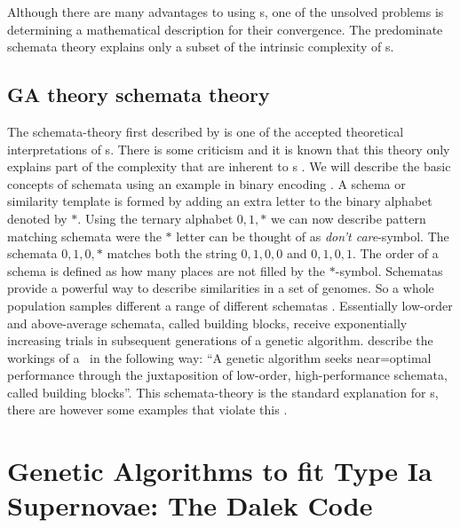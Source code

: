 Although there are many advantages to using \ga s, one of the unsolved problems is determining a mathematical description for their convergence. The predominate schemata theory explains only a subset of the intrinsic complexity of \ga s.

\subsection{GA theory schemata theory}

The schemata-theory first described by \cite{holland1975} is one of the accepted theoretical interpretations of \ga s. There is some criticism and it is known that this theory only explains part of the complexity that are inherent to \ga s \citep[see ][ and references therein]{Whitley94agenetic}. We will describe the basic concepts of schemata using an example in binary encoding \citep[notation adapted from ][]{citeulike:125978}. A schema or similarity template is formed by adding an extra letter to the binary alphabet denoted by $*$. Using the ternary alphabet ${0, 1, *}$ we can now describe pattern matching schemata were the $*$ letter can be thought of as \textit{don't care}-symbol. The schemata ${0, 1, 0, *}$ matches both the string ${0, 1, 0, 0}$ and ${0, 1, 0, 1}$. The order of a schema is defined as how many places are not filled by the $*$-symbol. Schematas provide a powerful way to describe similarities in a set of genomes. 
So a whole population samples different a range of different schematas . Essentially low-order and above-average schemata, called building blocks, receive exponentially increasing trials in subsequent generations of a genetic algorithm. \citet{Michalewicz:1994:GAD:184675} describe the workings of a \ga\ in the following way: ``A genetic algorithm seeks near=optimal performance through the juxtaposition of low-order, high-performance schemata, called building blocks''.
This schemata-theory is the standard explanation for \ga s, there are however some examples that violate this \citep[see chapter 3 of][for some examples]{Michalewicz:1994:GAD:184675}.


\section{Genetic Algorithms to fit Type Ia Supernovae: The Dalek Code}
\label{sec:geneticdalek}
